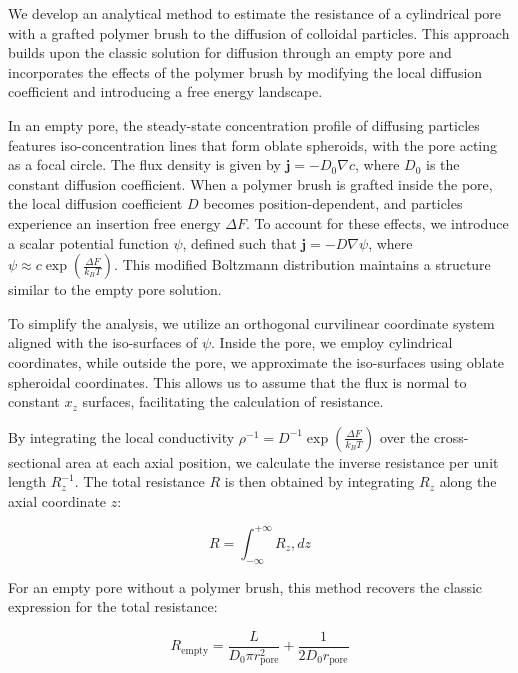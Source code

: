 \documentclass[12pt, a4paper]{article}
\begin{document}

We develop an analytical method to estimate the resistance of a cylindrical pore with a grafted polymer brush to the diffusion of colloidal particles. This approach builds upon the classic solution for diffusion through an empty pore and incorporates the effects of the polymer brush by modifying the local diffusion coefficient and introducing a free energy landscape.

In an empty pore, the steady-state concentration profile of diffusing particles features iso-concentration lines that form oblate spheroids, with the pore acting as a focal circle. The flux density is given by $\mathbf{j} = -D_0 \nabla c$, where $D_0$ is the constant diffusion coefficient. When a polymer brush is grafted inside the pore, the local diffusion coefficient $D$ becomes position-dependent, and particles experience an insertion free energy $\Delta F$. To account for these effects, we introduce a scalar potential function $\psi$, defined such that $\mathbf{j} = -D \nabla \psi$, where $\psi \approx c \exp\left( \frac{\Delta F}{k_B T} \right)$. This modified Boltzmann distribution maintains a structure similar to the empty pore solution.

To simplify the analysis, we utilize an orthogonal curvilinear coordinate system aligned with the iso-surfaces of $\psi$. Inside the pore, we employ cylindrical coordinates, while outside the pore, we approximate the iso-surfaces using oblate spheroidal coordinates. This allows us to assume that the flux is normal to constant $x_z$ surfaces, facilitating the calculation of resistance.

By integrating the local conductivity $\rho^{-1} = D^{-1} \exp\left( \frac{\Delta F}{k_B T} \right)$ over the cross-sectional area at each axial position, we calculate the inverse resistance per unit length $R_z^{-1}$. The total resistance $R$ is then obtained by integrating $R_z$ along the axial coordinate $z$:

\begin{equation} R = \int_{-\infty}^{+\infty} R_z , dz \end{equation}

For an empty pore without a polymer brush, this method recovers the classic expression for the total resistance:

\begin{equation} R_{\textrm{empty}} = \frac{L}{D_0 \pi r_{\textrm{pore}}^2} + \frac{1}{2 D_0 r_{\textrm{pore}}} \end{equation}
\end{document}
